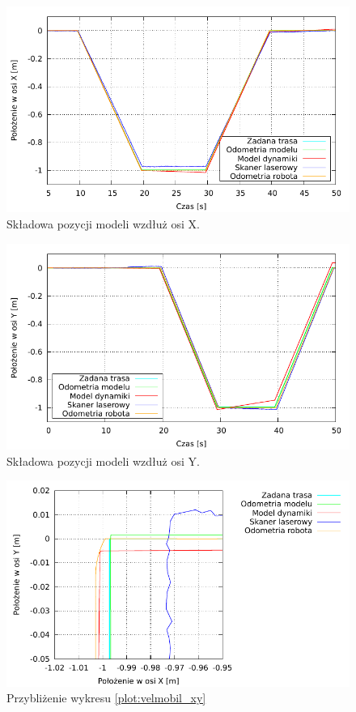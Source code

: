 		\begin{figure}[H]
			\centering
			\includegraphics[width=\textwidth]{plots/velmobil_xt.pdf}
				\caption{Składowa pozycji modeli wzdłuż osi X.}
			\label{plot:velmobil_xt}
		\end{figure}
		
		\begin{figure}[H]
			\centering
			\includegraphics[width=\textwidth]{plots/velmobil_yt.pdf}
				\caption{Składowa pozycji modeli wzdłuż osi Y.}
			\label{plot:velmobil_yt}
		\end{figure}
		
		\begin{figure}[H]
			\centering
			\includegraphics[width=\textwidth]{plots/velmobil_xy_s.pdf}
				\caption{Przybliżenie wykresu \ref{plot:velmobil_xy}}
			\label{plot:velmobil_xy_s}
		\end{figure}
		
